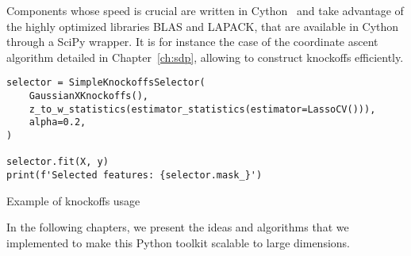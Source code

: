 Components whose speed is crucial are written in Cython~\citep{cython}
and take advantage of the highly optimized libraries BLAS and LAPACK,
that are available in Cython through a SciPy wrapper.
It is for instance the case of the coordinate ascent algorithm detailed in Chapter~\ref{ch:sdp},
allowing to construct knockoffs efficiently.
\begin{calgorithm}
\begin{verbatim}
selector = SimpleKnockoffsSelector(
    GaussianXKnockoffs(),
    z_to_w_statistics(estimator_statistics(estimator=LassoCV())),
    alpha=0.2,
)

selector.fit(X, y)
print(f'Selected features: {selector.mask_}')
\end{verbatim}
\caption{
    Example of knockoffs usage
}\label{code:python_knockoffs}
\end{calgorithm}

\bigbreak
In the following chapters,
we present the ideas and algorithms that we implemented to make this Python toolkit scalable to large dimensions.
